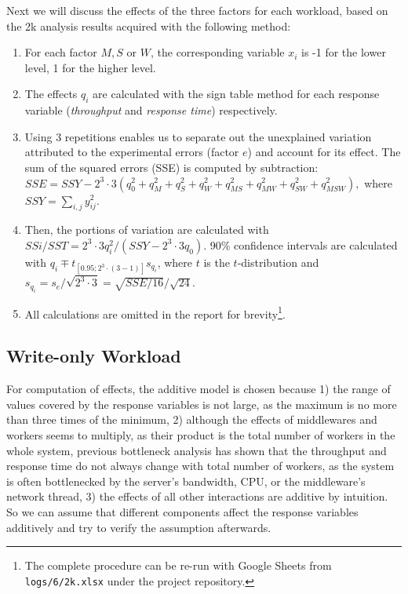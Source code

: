 Next we will discuss the effects of the three factors for each workload, based on the 2k analysis results acquired with the following method:

\begin{enumerate}[noitemsep,topsep=0pt]
\item For each factor $M, S$ or $W$, the corresponding variable $x_{i}$ is -1 for the lower level, 1 for the higher level.
\item The effects $q_i$ are calculated with the sign table method for each response variable (\textit{throughput} and \textit{response time}) respectively.
\item Using 3 repetitions enables us to separate out the unexplained variation attributed to the experimental errors (factor $e$) and account for its effect. The sum of the squared errors (SSE) is computed by subtraction: $ SSE = SSY - 2^{3}\cdot3(q_0^2 + q_M^2 + q_S^2 + q_W^2 + q_{MS}^2 + q_{MW}^2 + q_{SW}^2 + q_{MSW}^2), $ where $SSY=\sum_{i,j}y_{ij}^2$.
\item Then, the portions of variation are calculated with $ SSi/SST = 2^{3}\cdot3q_{i}^2/(SSY-2^{3}\cdot3q_{0}) $.
90\% confidence intervals are calculated with $ q_i \mp t_{[0.95;2^3\cdot(3-1)]}s_{q_i} $, where $t$ is the $t$-distribution and $s_{q_i} = s_e/\sqrt{2^{3}\cdot3}=\sqrt{SSE/16}/\sqrt{24}$.
\item All calculations are omitted in the report for brevity\footnote{The complete procedure can be re-run with Google Sheets from \texttt{logs/6/2k.xlsx} under the project repository.}.
\end{enumerate}


\subsection{Write-only Workload}

For computation of effects, the additive model is chosen because 1) the range of values covered by the response variables is not large, as the maximum is no more than three times of the minimum, 2) although the effects of middlewares and workers seems to multiply, as their product is the total number of workers in the whole system, previous bottleneck analysis has shown that the throughput and response time do not always change with total number of workers, as the system is often bottlenecked by the server's bandwidth, CPU, or the middleware's network thread, 3) the effects of all other interactions are additive by intuition. So we can assume that different components affect the response variables additively and try to verify the assumption afterwards.


